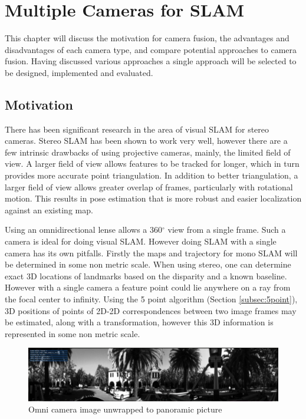 \chapter{Multiple Cameras for SLAM}
\label{chapter:MultiCamSLAM}

This chapter will discuss the motivation for camera fusion, the advantages and disadvantages of each camera type, and compare potential approaches to camera fusion.  Having discussed various approaches a single approach will be selected to be designed, implemented and evaluated.

\section{Motivation}

There has been significant research in the area of visual SLAM for stereo \\ cameras\cite{mei_09}\cite{paz_08}\cite{rslam}\cite{particle_slam}\cite{strasdat_11}.  Stereo SLAM has been shown to work very well, however there are a few intrinsic drawbacks of using projective cameras, mainly, the limited field of view.  A larger field of view allows features to be tracked for longer, which in turn provides more accurate point triangulation.  In addition to better triangulation, a larger field of view allows greater overlap of frames, particularly with rotational motion.  This results in pose estimation that is more robust and easier localization against an existing map. %

Using an omnidirectional lense allows a 360$^{\circ}$ view from a single frame.  Such a camera is ideal for doing visual SLAM.  However doing SLAM with a single camera has its own pitfalls.  Firstly the maps and trajectory for mono SLAM will be determined in some non metric scale.  When using stereo, one can determine exact 3D locations of landmarks based on the disparity and a known baseline.  However with a single camera a feature point could lie anywhere on a ray from the focal center to infinity.  Using the 5 point algorithm (Section \ref{subsec:5point}), 3D positions of points of 2D-2D correspondences between two image frames may be estimated, along with a transformation, however this 3D information is represented in some non metric scale.

\begin{figure}[h!]
  \centering
    \includegraphics[width=1.0\textwidth]{chapters/images/unwrapped}
    \caption{Omni camera image unwrapped to panoramic picture}
  \label{fig:unwrapped}
\end{figure}

